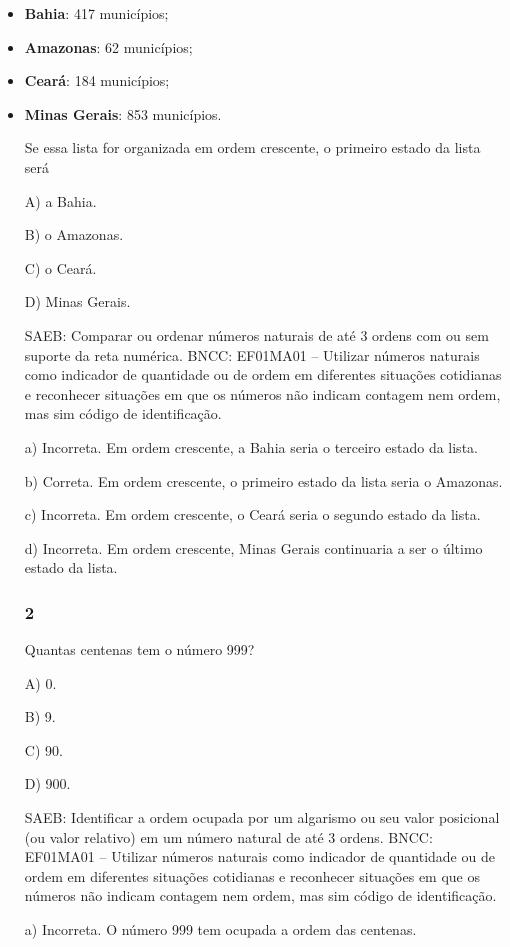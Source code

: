 \begin{itemize}
  \item \textbf{Bahia}: 417 municípios;
  \item \textbf{Amazonas}: 62 municípios;
  \item \textbf{Ceará}: 184 municípios;
  \item \textbf{Minas Gerais}: 853 municípios.
\begin{itemize}

Se essa lista for organizada em ordem crescente, o primeiro estado da lista será

A) a Bahia.

B) o Amazonas.

C) o Ceará.

D) Minas Gerais.

SAEB: Comparar ou ordenar números naturais de até 3 ordens com
ou sem suporte da reta numérica.
BNCC: EF01MA01 -- Utilizar números naturais como indicador de quantidade
ou de ordem em diferentes situações cotidianas e reconhecer situações em
que os números não indicam contagem nem ordem, mas sim código de
identificação.

a) Incorreta. Em ordem crescente, a Bahia seria o terceiro estado da lista.

b) Correta. Em ordem crescente, o primeiro estado da lista seria o Amazonas.

c) Incorreta. Em ordem crescente, o Ceará seria o segundo estado da lista.

d) Incorreta. Em ordem crescente, Minas Gerais continuaria a ser o último estado da lista.

\subsubsection{2}\label{section-118}

Quantas centenas tem o número 999?

A) 0.

B) 9.

C) 90.

D) 900.

SAEB: Identificar a ordem ocupada por um algarismo ou seu valor
posicional (ou valor relativo) em um número natural de até 3 ordens.
BNCC: EF01MA01 -- Utilizar números naturais como indicador de quantidade
ou de ordem em diferentes situações cotidianas e reconhecer situações em
que os números não indicam contagem nem ordem, mas sim código de
identificação.

a) Incorreta. O número 999 tem ocupada a ordem das centenas.


\end{itemize}
\end{itemize}
